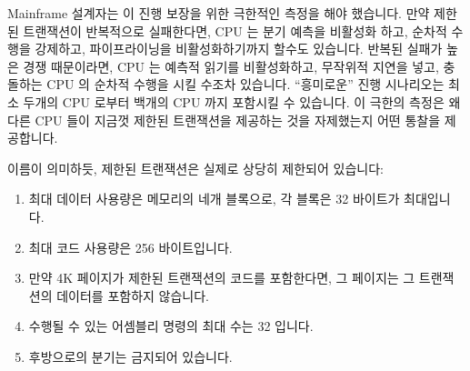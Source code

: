 \fi

Mainframe 설계자는 이 진행 보장을 위한 극한적인 측정을 해야 했습니다.
만약 제한된 트랜잭션이 반복적으로 실패한다면, CPU 는 분기 예측을 비활성화 하고,
순차적 수행을 강제하고, 파이프라이닝을 비활성화하기까지 할수도 있습니다.
반복된 실패가 높은 경쟁 때문이라면, CPU 는 예측적 읽기를 비활성화하고, 무작위적
지연을 넣고, 충돌하는 CPU 의 순차적 수행을 시킬 수조차 있습니다.
``흥미로운'' 진행 시나리오는 최소 두개의 CPU 로부터 백개의 CPU 까지 포함시킬 수
있습니다.
이 극한의 측정은 왜 다른 CPU 들이 지금껏 제한된 트랜잭션을 제공하는 것을
자제했는지 어떤 통찰을 제공합니다.

이름이 의미하듯, 제한된 트랜잭션은 실제로 상당히 제한되어 있습니다:

\iffalse

The Mainframe architects needed to take extreme measures to deliver on
this forward-progress guarantee.
If a given constrained transaction repeatedly fails, the CPU
might disable branch prediction, force in-order execution, and even
disable pipelining.
If the repeated failures are due to high contention, the CPU might
disable speculative fetches, introduce random delays, and even
serialize execution of the conflicting CPUs.
``Interesting'' forward-progress scenarios involve as few as two CPUs
or as many as one hundred CPUs.
Perhaps these extreme measures provide some insight as to why other CPUs
have thus far refrained from offering constrained transactions.

As the name implies, constrained transactions are in fact severely constrained:

\fi

\begin{enumerate}
\item	최대 데이터 사용량은 메모리의 네개 블록으로, 각 블록은 32 바이트가
	최대입니다.
\item	최대 코드 사용량은 256 바이트입니다.
\item	만약 4K 페이지가 제한된 트랜잭션의 코드를 포함한다면, 그 페이지는 그
	트랜잭션의 데이터를 포함하지 않습니다.
\item	수행될 수 있는 어셈블리 명령의 최대 수는 32 입니다.
\item	후방으로의 분기는 금지되어 있습니다.

\iffalse

\item	The maximum data footprint is four blocks of memory,
	where each block can be no larger than 32 bytes.
\item	The maximum code footprint is 256 bytes.
\item	If a given 4K page contains a constrained transaction's code,
	then that page may not contain that transaction's data.
\item	The maximum number of assembly instructions that may be executed
	is 32.
\item	Backwards branches are forbidden.

\fi

\end{enumerate}

